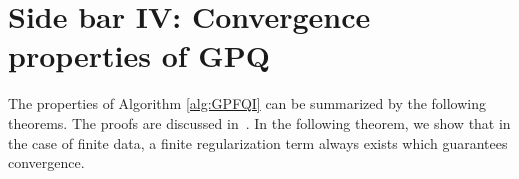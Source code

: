 \documentclass[letterpaper,12pt,peerreviewca,draftcls]{IEEEtran}
\begin{document}
\section{Side bar IV: Convergence properties of GPQ} 
 The properties of Algorithm \ref{alg:GPFQI} can be summarized by the following theorems. The proofs are discussed in~\cite{chowdhary2014off}.
 In the following theorem, we show that in the case of finite data, a finite regularization term always exists which guarantees convergence.

  
  
  
  
\end{document}
